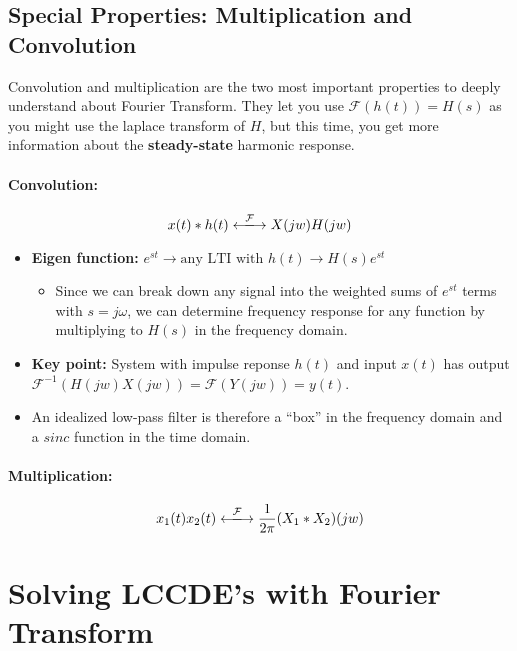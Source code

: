 \documentclass[a4paper,12pt]{report}
\def\fft{\xlongleftrightarrow{\mathcal{F}}}
\begin{document}
\subsection{Special Properties: Multiplication and Convolution}

Convolution and multiplication are the two most important properties to deeply understand about Fourier Transform. They let you use $\mathcal{F}(h(t)) = H(s)$ as you might use the laplace transform of $H$, but this time, you get more information about the \textbf{steady-state} harmonic response. 

\paragraph{Convolution: } \begin{equation}
x(t)*h(t) \fft X(jw)H(jw)
\end{equation}
\begin{itemize}
\item \textbf{Eigen function:} $e^{st} \to \text{any LTI with }h(t) \to H(s)e^{st}$
\begin{itemize}
\item Since we can break down any signal into the weighted sums of $e^{st}$ terms with $s=j\omega$, we can determine frequency response for any function by multiplying to $H(s)$ in the frequency domain. 
\end{itemize}
\item \textbf{Key point:} System with impulse reponse $h(t)$ and input $x(t)$ has output $\mathcal{F}^{-1}(H(jw)X(jw)) = \mathcal{F}(Y(jw)) = y(t)$.
\item An idealized low-pass filter is therefore a ``box'' in the frequency domain and a $sinc$ function in the time domain. 
\end{itemize}



\paragraph{Multiplication: } \begin{equation}
x_1(t)x_2(t) \fft \frac{1}{2\pi} (X_1*X_2)(jw) 
\end{equation}




\section{Solving LCCDE's with Fourier Transform}
\end{document}
